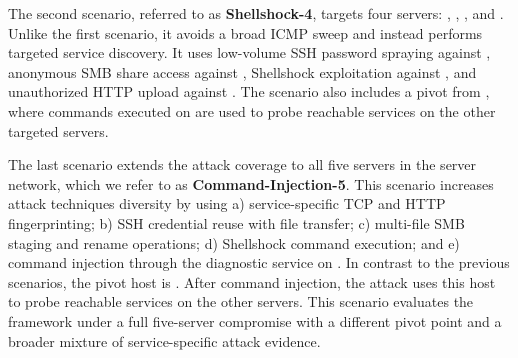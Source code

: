 \documentclass[runningheads,10pt]{llncs}
\begin{document}
The second scenario, referred to as \textbf{Shellshock-4}, targets four servers: , , , and . Unlike the first scenario, it avoids a broad ICMP sweep and instead performs targeted service discovery. It uses low-volume SSH password spraying against , anonymous SMB share access against , Shellshock exploitation against , and unauthorized HTTP upload against . The scenario also includes a pivot from , where commands executed on  are used to probe reachable services on the other targeted servers.

The last scenario extends the attack coverage to all five servers in the server network, which we refer to as \textbf{Command-Injection-5}. This scenario increases attack techniques diversity by using a) service-specific TCP and HTTP fingerprinting; b) SSH credential reuse with file transfer; c) multi-file SMB staging and rename operations; d) Shellshock command execution; and e) command injection through the diagnostic service on . In contrast to the previous scenarios, the pivot host is . After command injection, the attack uses this host to probe reachable services on the other servers. This scenario evaluates the framework under a full five-server compromise with a different pivot point and a broader mixture of service-specific attack evidence.
\end{document}

